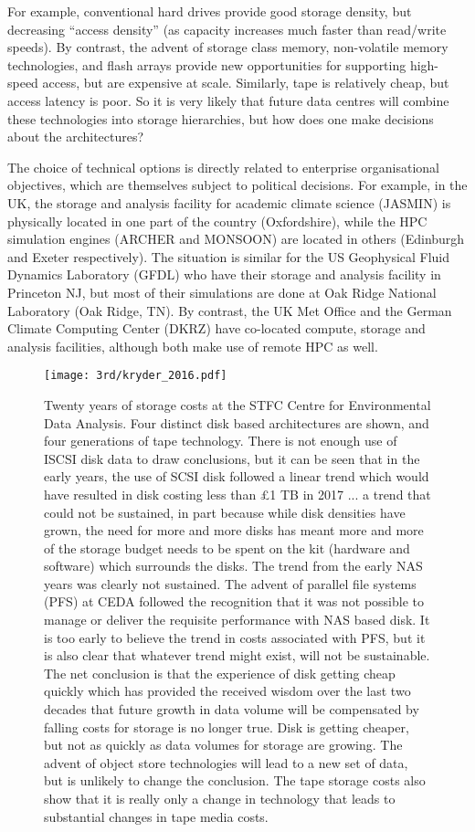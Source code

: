 For example, conventional hard drives provide good storage density, but decreasing ``access density'' (as capacity
increases much faster than read/write speeds). By contrast, the advent of storage class memory, non-volatile memory technologies, and flash arrays provide new opportunities for supporting high-speed access, but are expensive at scale. Similarly, tape is relatively cheap, but access latency is poor.  So it is very likely that future data centres will combine these technologies into storage hierarchies, but how does one make decisions about the architectures? 

The choice of technical options is directly related to enterprise organisational objectives, which are themselves subject to political decisions. For example, in the UK, 
the storage and analysis facility for academic climate science (JASMIN) is physically located in one part of the country (Oxfordshire), while the HPC simulation 
engines (ARCHER and MONSOON) are located in others (Edinburgh and Exeter respectively). The situation is similar for the US Geophysical Fluid Dynamics 
Laboratory (GFDL) who have their storage and analysis facility in Princeton NJ, but most of their simulations are done at Oak Ridge National Laboratory (Oak 
Ridge, TN). By contrast, the UK Met Office and the German Climate Computing Center (DKRZ) have co-located compute, storage and analysis facilities, although 
both make use of remote HPC as well. 

\begin{figure}
\centering
\texttt{[image: 3rd/kryder\_2016.pdf]}
\caption{Twenty years of storage costs at the STFC Centre for Environmental Data Analysis. Four distinct disk based architectures are shown, and four generations 
of tape technology. There is not enough use of ISCSI disk data to draw conclusions, but it can be seen that in the early years, the use of SCSI disk followed a linear 
trend which would have resulted in disk costing less than \pounds 1 TB in 2017 ... a trend that could not be sustained, in part because while disk densities have 
grown, the need for more and more disks has meant more and more of the storage budget needs to be spent on the kit (hardware and software) which surrounds the 
disks. The trend from the early NAS years was clearly not sustained. The advent of parallel file systems (PFS) at CEDA followed the recognition that it was not 
possible to manage or deliver the requisite performance with NAS based disk. It is too early to believe the trend in costs associated with PFS, but it is also clear that 
whatever trend might exist, will not be sustainable. The net conclusion is that the experience of disk getting cheap quickly which has provided the received wisdom 
over the last two decades that future growth in data volume will be compensated by falling costs for storage is no longer true. Disk is getting cheaper, but not as 
quickly as data volumes for storage are growing.  The advent of object store technologies will lead to a new set of data, but is unlikely to change the conclusion.
The tape storage costs also show that it is really only a change in technology that leads to substantial changes in tape media costs.
\label{fig:kryder}}
\end{figure}


